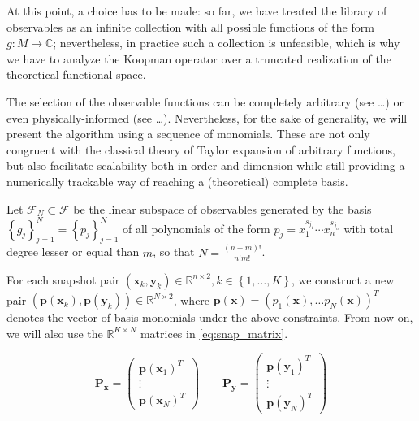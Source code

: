 \documentclass{article}
\begin{document}
        At this point, a choice has to be made: so far, we have treated the library of observables as an infinite collection with all possible functions of the form $g:M \mapsto \mathbb{C}$; nevertheless, in practice such a collection is unfeasible, which is why we have to analyze the Koopman operator over a truncated realization of the theoretical functional space.

        The selection of the observable functions can be completely arbitrary (see \dots) or even physically-informed (see \dots). Nevertheless, for the sake of generality, we will present the algorithm using a sequence of monomials. These are not only congruent with the classical theory of Taylor expansion of arbitrary functions, but also facilitate scalability both in order and dimension while still providing a numerically trackable way of reaching a (theoretical) complete basis.

        Let $\mathcal{F}_N \subset \mathcal{F}$ be the linear subspace of observables generated by the basis $\left\{g_j\right\}_{j=1}^{N} = \left\{p_j\right\}_{j=1}^{N}$ of all polynomials of the form $p_j = x_1^{s_{j_1}} \cdots x_n^{s_{j_n}}$ with total degree lesser or equal than $m$, so that $N = \frac{(n+m)!}{n!m!}$.

        For each snapshot pair $\left(\mathbf{x}_k,\mathbf{y}_k\right) \in \mathbb{R}^{n \times 2} , k \in \left\{1,\dots,K\right\}$, we construct a new pair $\left(\mathbf{p}\left(\mathbf{x}_k\right),\mathbf{p}\left(\mathbf{y}_k\right)\right) \in \mathbb{R}^{N \times 2}$, where $\mathbf{p}\left(\mathbf{x}\right) = \left(p_1\left(\mathbf{x}\right) , \dots p_N\left(\mathbf{x}\right)\right)^T$ denotes the vector of basis monomials under the above constraints. From now on, we will also use the $\mathbb{R}^{K \times N}$ matrices in \cref{eq:snap_matrix}.

        \begin{equation} \label{eq:snap_matrix}
            \mathbf{P_x} =
            \begin{pmatrix}
                \mathbf{p}\left(\mathbf{x}_1\right)^T \\
                \vdots \\
                \mathbf{p}\left(\mathbf{x}_N\right)^T
            \end{pmatrix}
            \qquad
            \mathbf{P_y} =
            \begin{pmatrix}
                \mathbf{p}\left(\mathbf{y}_1\right)^T \\
                \vdots \\
                \mathbf{p}\left(\mathbf{y}_N\right)^T
            \end{pmatrix}
        \end{equation}
\end{document}
